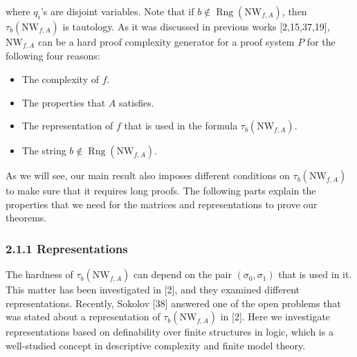 \documentclass[10pt,a4paper]{article}
\begin{document}
where $q_i$'s are disjoint variables. Note that if $b\notin\operatorname{Rng}(\mathrm{NW}_{f,A})$, then $\tau_b(\mathrm{NW}_{f,A})$ is tautology.
As it was discussed in previous works [2,15,37,19], $\mathrm{NW}_{f,A}$ can be a hard proof complexity generator for a proof system $P$ for the following four reasons:
\begin{itemize}
\item The complexity of $f$.
\item The properties that $A$ satisfies.
\item The representation of $f$ that is used in the formula $\tau_b(\mathrm{NW}_{f,A})$.
\item The string $b\notin\operatorname{Rng}(\mathrm{NW}_{f,A})$.
\end{itemize}
As we will see, our main result also imposes different conditions on $\tau_b(\mathrm{NW}_{f,A})$ to make sure that it requires long proofs.
The following parts explain the properties that we need for the matrices and representations to prove our theorems.
\subsubsection*{2.1.1 Representations}
The hardness of $\tau_b(\mathrm{NW}_{f,A})$ can depend on the pair $(\sigma_0,\sigma_1)$ that is used in it. This matter has been investigated in [2], and they examined different representations. Recently, Sokolov [38] answered one of the open problems that was stated about a representation of $\tau_b(\mathrm{NW}_{f,A})$ in [2]. Here we investigate representations based on definability over finite structures in logic, which is a well-studied concept in descriptive complexity and finite model theory.
\end{document}

